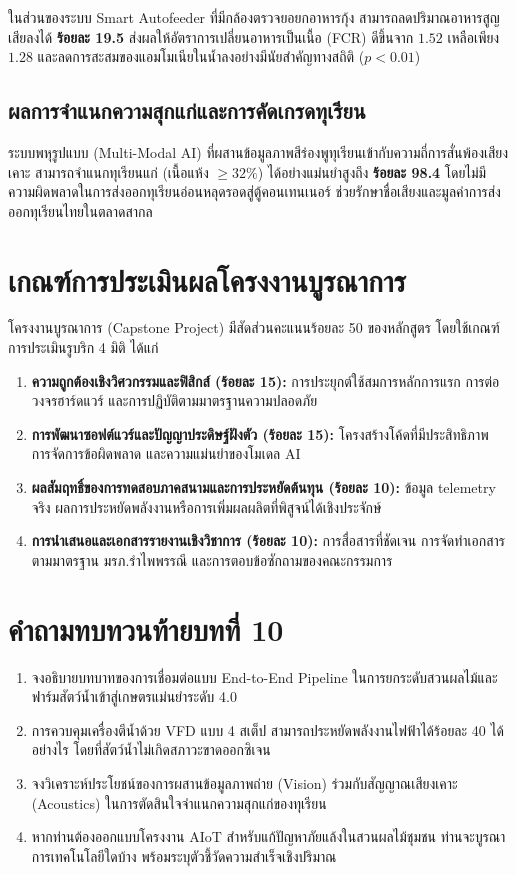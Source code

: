 ในส่วนของระบบ Smart Autofeeder ที่มีกล้องตรวจยอยกอาหารกุ้ง สามารถลดปริมาณอาหารสูญเสียลงได้ \textbf{ร้อยละ 19.5} ส่งผลให้อัตราการเปลี่ยนอาหารเป็นเนื้อ (FCR) ดีขึ้นจาก $1.52$ เหลือเพียง $1.28$ และลดการสะสมของแอมโมเนียในน้ำลงอย่างมีนัยสำคัญทางสถิติ ($p < 0.01$)

\subsection{ผลการจำแนกความสุกแก่และการคัดเกรดทุเรียน}

ระบบพหุรูปแบบ (Multi-Modal AI) ที่ผสานข้อมูลภาพสีร่องพูทุเรียนเข้ากับความถี่การสั่นพ้องเสียงเคาะ สามารถจำแนกทุเรียนแก่ (เนื้อแห้ง $\ge 32\%$) ได้อย่างแม่นยำสูงถึง \textbf{ร้อยละ 98.4} โดยไม่มีความผิดพลาดในการส่งออกทุเรียนอ่อนหลุดรอดสู่ตู้คอนเทนเนอร์ ช่วยรักษาชื่อเสียงและมูลค่าการส่งออกทุเรียนไทยในตลาดสากล

\section{เกณฑ์การประเมินผลโครงงานบูรณาการ}

โครงงานบูรณาการ (Capstone Project) มีสัดส่วนคะแนนร้อยละ 50 ของหลักสูตร โดยใช้เกณฑ์การประเมินรูบริก 4 มิติ ได้แก่
\begin{enumerate}[leftmargin=1.5em]
    \item \textbf{ความถูกต้องเชิงวิศวกรรมและฟิสิกส์ (ร้อยละ 15):} การประยุกต์ใช้สมการหลักการแรก การต่อวงจรฮาร์ดแวร์ และการปฏิบัติตามมาตรฐานความปลอดภัย
    \item \textbf{การพัฒนาซอฟต์แวร์และปัญญาประดิษฐ์ฝังตัว (ร้อยละ 15):} โครงสร้างโค้ดที่มีประสิทธิภาพ การจัดการข้อผิดพลาด และความแม่นยำของโมเดล AI
    \item \textbf{ผลสัมฤทธิ์ของการทดสอบภาคสนามและการประหยัดต้นทุน (ร้อยละ 10):} ข้อมูล telemetry จริง ผลการประหยัดพลังงานหรือการเพิ่มผลผลิตที่พิสูจน์ได้เชิงประจักษ์
    \item \textbf{การนำเสนอและเอกสารรายงานเชิงวิชาการ (ร้อยละ 10):} การสื่อสารที่ชัดเจน การจัดทำเอกสารตามมาตรฐาน มรภ.รำไพพรรณี และการตอบข้อซักถามของคณะกรรมการ
\end{enumerate}

\section*{คำถามทบทวนท้ายบทที่ 10}

\begin{enumerate}
    \item จงอธิบายบทบาทของการเชื่อมต่อแบบ End-to-End Pipeline ในการยกระดับสวนผลไม้และฟาร์มสัตว์น้ำเข้าสู่เกษตรแม่นยำระดับ 4.0
    \item การควบคุมเครื่องตีน้ำด้วย VFD แบบ 4 สเต็ป สามารถประหยัดพลังงานไฟฟ้าได้ร้อยละ 40 ได้อย่างไร โดยที่สัตว์น้ำไม่เกิดสภาวะขาดออกซิเจน
    \item จงวิเคราะห์ประโยชน์ของการผสานข้อมูลภาพถ่าย (Vision) ร่วมกับสัญญาณเสียงเคาะ (Acoustics) ในการตัดสินใจจำแนกความสุกแก่ของทุเรียน
    \item หากท่านต้องออกแบบโครงงาน AIoT สำหรับแก้ปัญหาภัยแล้งในสวนผลไม้ชุมชน ท่านจะบูรณาการเทคโนโลยีใดบ้าง พร้อมระบุตัวชี้วัดความสำเร็จเชิงปริมาณ
\end{enumerate}
\clearpage

